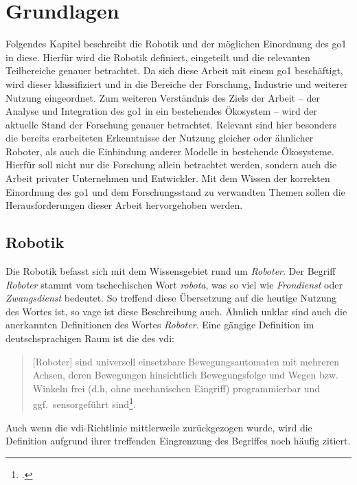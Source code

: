 \section{Grundlagen}
\label{sec:grundlagen}
Folgendes Kapitel beschreibt die Robotik und der möglichen Einordnung des \gls{go1} in diese.
Hierfür wird die Robotik definiert, eingeteilt und die relevanten Teilbereiche genauer betrachtet.
Da sich diese Arbeit mit einem \gls{go1} beschäftigt, wird dieser klassifiziert und in die Bereiche der Forschung, Industrie und weiterer Nutzung eingeordnet.
Zum weiteren Verständnis des Ziels der Arbeit -- der Analyse und Integration des \gls{go1} in ein bestehendes Ökosystem --
wird der aktuelle Stand der Forschung genauer betrachtet.
Relevant sind hier besonders die bereits erarbeiteten Erkenntnisse der Nutzung gleicher oder ähnlicher Roboter, als auch
die Einbindung anderer Modelle in bestehende Ökosysteme.
Hierfür soll nicht nur die Forschung allein betrachtet werden, sondern auch die Arbeit privater Unternehmen und Entwickler.
Mit dem Wissen der korrekten Einordnung des \gls{go1} und dem Forschungsstand zu verwandten Themen sollen die Herausforderungen dieser
Arbeit hervorgehoben werden.

\subsection{Robotik}
\label{subsec:robotik}

Die Robotik befasst sich mit dem Wissensgebiet rund um \emph{Roboter}.
Der Begriff \emph{Roboter} stammt vom tschechischen Wort \emph{robota}, was so viel wie \emph{Frondienst} oder \emph{Zwangsdienst} bedeutet.
So treffend diese Übersetzung auf die heutige Nutzung des Wortes ist, so vage ist diese Beschreibung auch.
Ähnlich unklar sind auch die anerkannten Definitionen des Wortes \emph{Roboter}.
Eine gängige Definition im deutschsprachigen Raum ist die des \gls{vdi}:

\begin{quote}
[Roboter]
    sind universell einsetzbare Bewegungsautomaten mit mehreren Achsen,
    deren Bewegungen hinsichtlich Bewegungsfolge und Wegen bzw.
    Winkeln frei (d.h, ohne mechanischen Eingriff) programmierbar und ggf.~sensorgeführt sind\footcite{vdi_2860}.
\end{quote}

\noindent Auch wenn die \gls{vdi}-Richtlinie mittlerweile zurückgezogen wurde, wird die Definition aufgrund ihrer treffenden Eingrenzung
des Begriffes noch häufig zitiert.

